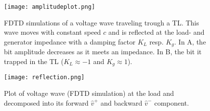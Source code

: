 \begin{figure}[h!]
\centering
\texttt{[image: amplitudeplot.png]}
\caption{FDTD simulations of a voltage wave traveling trough a TL. This wave moves with constant speed $c$ and is reflected at the load- and generator impedance with a damping factor $K_L$ resp. $K_g$. In A, the bit amplitude decreases as it meets an impedance. In B, the bit it trapped in the TL ($K_L\approx-1$ and $K_g \approx1$).}\label{fig:damp}
\end{figure}

\begin{figure}[h!]
\centering
\texttt{[image: reflection.png]}
\caption{Plot of voltage wave (FDTD simulation) at the load and decomposed into its forward $\hat{v}^{+}$ and backward $\hat{v}^{-}$ component.}\label{fig:refl}
\end{figure}














